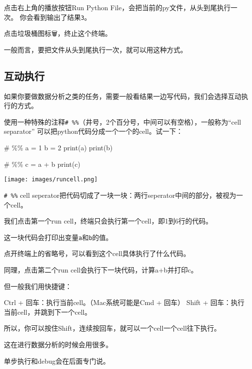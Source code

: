 \documentclass[
  letterpaper,
  DIV=11,
  numbers=noendperiod]{scrreprt}
\newenvironment{Shaded}{\begin{snugshade}}{\end{snugshade}}
\newcommand{\BuiltInTok}[1]{\textcolor[rgb]{0.00,0.23,0.31}{#1}}
\newcommand{\CommentTok}[1]{\textcolor[rgb]{0.37,0.37,0.37}{#1}}
\newcommand{\DecValTok}[1]{\textcolor[rgb]{0.68,0.00,0.00}{#1}}
\newcommand{\NormalTok}[1]{\textcolor[rgb]{0.00,0.23,0.31}{#1}}
\newcommand{\OperatorTok}[1]{\textcolor[rgb]{0.37,0.37,0.37}{#1}}
\begin{document}
点击右上角的播放按钮Run Python
File，会把当前的py文件，从头到尾执行一次。
你会看到输出了结果\texttt{3}。

点击垃圾桶图标🗑，终止这个终端。

一般而言，要把文件从头到尾执行一次，就可以用这种方式。

\hypertarget{ux4e92ux52a8ux6267ux884c}{%
\subsection{互动执行}\label{ux4e92ux52a8ux6267ux884c}}

如果你要做数据分析之类的任务，需要一般看结果一边写代码，我们会选择互动执行的方式。

使用一种特殊的注释\texttt{\#\ \%\%}（井号，2个百分号，中间可以有空格），一般称为``cell
separator'' 可以把python代码分成一个一个的cell。试一下：

\begin{Shaded}
\begin{Highlighting}[]
\CommentTok{\# \%\%}
\NormalTok{a }\OperatorTok{=} \DecValTok{1}
\NormalTok{b }\OperatorTok{=} \DecValTok{2}
\BuiltInTok{print}\NormalTok{(a)}
\BuiltInTok{print}\NormalTok{(b)}

\CommentTok{\# \%\%}
\NormalTok{c }\OperatorTok{=}\NormalTok{ a }\OperatorTok{+}\NormalTok{ b}
\BuiltInTok{print}\NormalTok{(c)}
\end{Highlighting}
\end{Shaded}

\texttt{[image: images/runcell.png]}

\texttt{\#\ \%\%} cell
seperator把代码切成了一块一块：两行seperator中间的部分，被视为一个cell。

我们点击第一个run cell，终端只会执行第一个cell，即1到6行的代码。

这一块代码会打印出变量\texttt{a}和\texttt{b}的值。

点开终端上的省略号，可以看到这个cell具体执行了什么代码。

同理，点击第二个run cell会执行下一块代码，计算a+b并打印c。

但一般我们用快捷键：

Ctrl + 回车：执行当前cell。（Mac系统可能是Cmd + 回车） Shift +
回车：执行当前cell，并跳到下一个cell。

所以，你可以按住Shift，连续按回车，就可以一个cell一个cell往下执行。

这在进行数据分析的时候会用很多。

单步执行和debug会在后面专门说。
\end{document}
